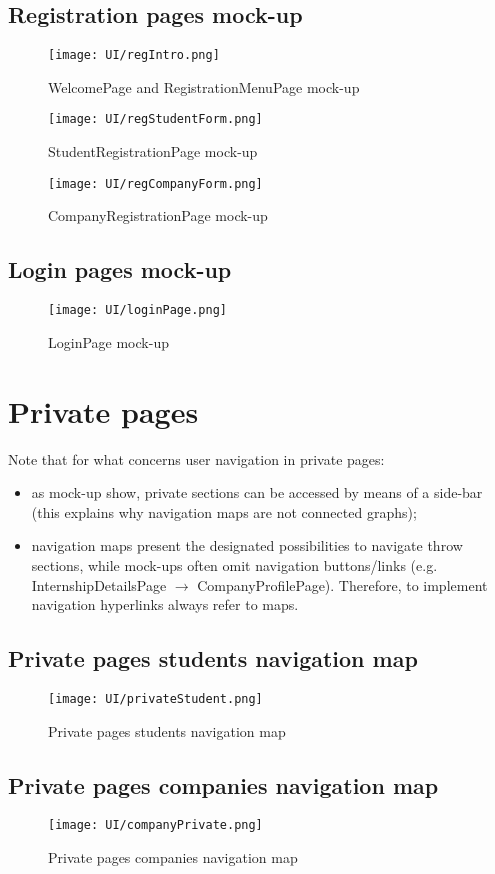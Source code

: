 	\subsection{Registration pages mock-up}
	\begin{figure}[H]
		\centering
		\caption{WelcomePage and RegistrationMenuPage mock-up}
		\texttt{[image: UI/regIntro.png]}
	\end{figure}
	\begin{figure}[H]
		\centering
		\caption{StudentRegistrationPage mock-up}
		\texttt{[image: UI/regStudentForm.png]}
	\end{figure}
	\begin{figure}[H]
		\centering
		\caption{CompanyRegistrationPage mock-up}
		\texttt{[image: UI/regCompanyForm.png]}
	\end{figure}
	\subsection{Login pages mock-up}
	\begin{figure}[H]
		\centering
		\caption{LoginPage mock-up}
		\texttt{[image: UI/loginPage.png]}
	\end{figure}
	\section{Private pages}
	Note that for what concerns user navigation in private pages:
	\begin{itemize}
		\item as mock-up show, private sections can be accessed by means of a side-bar (this explains why navigation maps are not connected graphs);
		\item navigation maps present the designated possibilities to navigate throw sections, while mock-ups often omit navigation buttons/links (e.g. InternshipDetailsPage $\rightarrow$ CompanyProfilePage). Therefore, to implement navigation hyperlinks always refer to maps.
	\end{itemize}
	\subsection{Private pages students navigation map}
	\begin{figure}[H]
		\centering
		\caption{Private pages students navigation map}
		\texttt{[image: UI/privateStudent.png]}
	\end{figure}
	\subsection{Private pages companies navigation map}
	\begin{figure}[H]
		\centering
		\caption{Private pages companies navigation map}
		\texttt{[image: UI/companyPrivate.png]}
	\end{figure}
